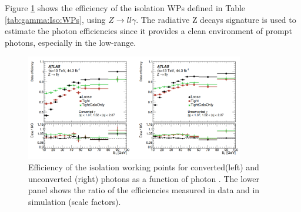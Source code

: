 Figure \ref{fig:gamma:Iso:Eff} shows the efficiency of the isolation WPs defined in Table \ref{tab:gamma:Iso:WPs}, using $Z\rightarrow ll\gamma$. The radiative Z decays signature is used to estimate the photon efficiencies since it provides a clean environment of prompt photons, especially in the low-\eT range. 
\begin{figure}[htbp]
    \centering
    \includegraphics[width=0.85\textwidth]{Ch3/Img/Photon_Iso_Eff.png}
    \caption{Efficiency of the isolation working points for converted(left) and unconverted (right) photons as a function of photon \eT. The lower panel shows the ratio of the efficiencies measured in data and in simulation (scale factors).}
    \label{fig:gamma:Iso:Eff}
\end{figure}

